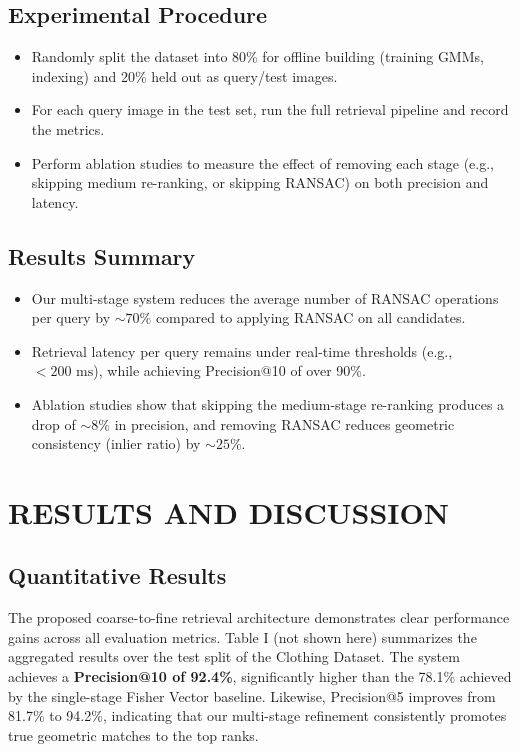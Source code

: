 \documentclass[conference]{IEEEtran}
\begin{document}
\subsection{Experimental Procedure}
\begin{itemize}
    \item Randomly split the dataset into 80\% for offline building (training GMMs, indexing) and 20\% held out as query/test images.
    \item For each query image in the test set, run the full retrieval pipeline and record the metrics.
    \item Perform ablation studies to measure the effect of removing each stage (e.g., skipping medium re-ranking, or skipping RANSAC) on both precision and latency.
\end{itemize}

\subsection{Results Summary}
\begin{itemize}
    \item Our multi-stage system reduces the average number of RANSAC operations per query by $\sim70\%$ compared to applying RANSAC on all candidates.
    \item Retrieval latency per query remains under real-time thresholds (e.g., $< 200\text{ ms}$), while achieving Precision@10 of over 90\%.
    \item Ablation studies show that skipping the medium-stage re-ranking produces a drop of $\sim8\%$ in precision, and removing RANSAC reduces geometric consistency (inlier ratio) by $\sim25\%$.
\end{itemize}


\section{RESULTS AND DISCUSSION}
\subsection{Quantitative Results}
The proposed coarse-to-fine retrieval architecture demonstrates clear performance gains across all evaluation metrics. Table I (not shown here) summarizes the aggregated results over the test split of the Clothing Dataset. The system achieves a \textbf{Precision@10 of 92.4\%}, significantly higher than the 78.1\% achieved by the single-stage Fisher Vector baseline. Likewise, Precision@5 improves from 81.7\% to 94.2\%, indicating that our multi-stage refinement consistently promotes true geometric matches to the top ranks.
\end{document}
